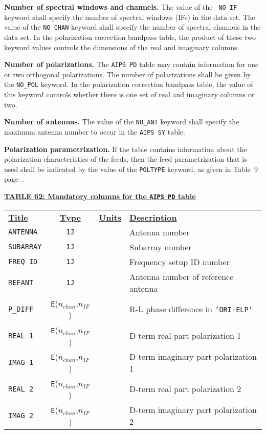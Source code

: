 \documentclass[twoside]{article}
\newcommand{\nif}{$n_{IF}$}
\newcommand{\nchan}{$n_{chan}$}
\begin{document}
{\bf Number of spectral windows and channels.} The value of the {\tt
  NO\_IF} keyword shall specify the number of spectral windows (IFs)
in the data set.  The value of the {\tt NO\_CHAN} keyword shall
specify the number of spectral channels in the data set.  In the
polarization correction bandpass table, the product of these two
keyword values controls the dimensions of the real and imaginary
columns.

{\bf Number of polarizations.}  The {\tt AIPS PD} table may contain
information for one or two orthogonal polarizations.  The number of
polarizations shall be given by the {\tt NO\_POL} keyword.   In the
polarization correction bandpass table, the value of this keyword
controls whether there is one set of real and imaginary columns or
two.

{\bf Number of antennas.} The value of the {\tt NO\_ANT} keyword shall
specify the maximum antenna number to occur in the {\tt AIPS SY} table.

{\bf Polarization parametrization.} If the table contains information
about the polarization characteristics of the feeds, then the feed
parametrization that is used shall be indicated by the value of the
{\tt POLTYPE} keyword, as given in Table~9
page~\pageref{ta:ANpoltypes}.

\begin{center}
\underline{\bf{TABLE 62: Mandatory columns for the {\tt AIPS PD} table}}\\
\begin{tabular}{lcll}
\noalign{\vspace{2pt}} \label{ta:PDcols}
\underline{{\bf Title\vphantom{y}}} & \underline{\bf{Type}} &
   \underline{{\bf Units\vphantom{y}}} & \underline{\bf{Description}} \\
\noalign{\vspace{2pt}}
{\tt ANTENNA}  & {\tt 1J} &      & Antenna number \\
{\tt SUBARRAY} & {\tt 1J} &      & Subarray number \\
{\tt FREQ ID}  & {\tt 1J} &      & Frequency setup ID number \\
{\tt REFANT}   & {\tt 1J} &      & Antenna number of reference antenna \\
{\tt P\_DIFF}  & {\tt E}(\nchan,\nif) & & R-L phase difference in {\tt   'ORI-ELP'} \\
{\tt REAL 1}   & {\tt E}(\nchan,\nif) & & D-term real part polarization 1 \\
{\tt IMAG 1}   & {\tt E}(\nchan,\nif) & & D-term imaginary part polarization 1 \\
\hline
{\tt REAL 2}   & {\tt E}(\nchan,\nif) & & D-term real part polarization 2 \\
{\tt IMAG 2}   & {\tt E}(\nchan,\nif) & & D-term imaginary part polarization 2
\end{tabular}
\end{center}
\end{document}
